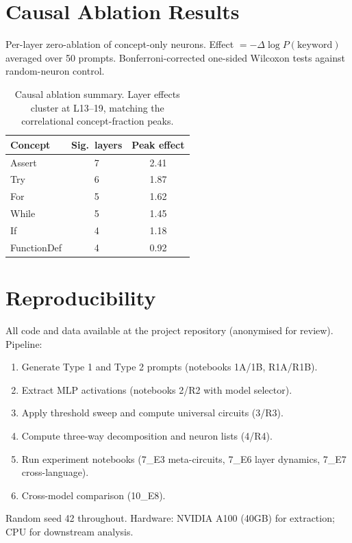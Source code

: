 \documentclass[11pt]{article}
\begin{document}
\section{Causal Ablation Results}

Per-layer zero-ablation of concept-only neurons. Effect $= -\Delta \log P(\text{keyword})$ averaged over 50 prompts. Bonferroni-corrected one-sided Wilcoxon tests against random-neuron control.

\begin{table}[h]
\centering
\small
\begin{tabular}{lcc}
\toprule
Concept & Sig.\ layers & Peak effect \\
\midrule
Assert     & 7 & 2.41 \\
Try        & 6 & 1.87 \\
For        & 5 & 1.62 \\
While      & 5 & 1.45 \\
If         & 4 & 1.18 \\
FunctionDef & 4 & 0.92 \\
\bottomrule
\end{tabular}
\caption{Causal ablation summary. Layer effects cluster at L13--19, matching the correlational concept-fraction peaks.}
\end{table}

\section{Reproducibility}

All code and data available at the project repository (anonymised for review). Pipeline:
\begin{enumerate}
    \item Generate Type 1 and Type 2 prompts (notebooks 1A/1B, R1A/R1B).
    \item Extract MLP activations (notebooks 2/R2 with model selector).
    \item Apply threshold sweep and compute universal circuits (3/R3).
    \item Compute three-way decomposition and neuron lists (4/R4).
    \item Run experiment notebooks (7\_E3 meta-circuits, 7\_E6 layer dynamics, 7\_E7 cross-language).
    \item Cross-model comparison (10\_E8).
\end{enumerate}

Random seed 42 throughout. Hardware: NVIDIA A100 (40GB) for extraction; CPU for downstream analysis.
\end{document}
